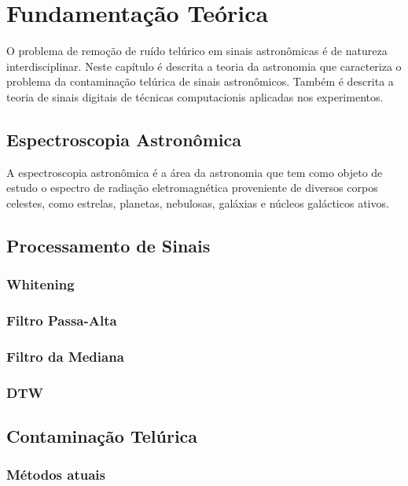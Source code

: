\chapter{Fundamentação Teórica}
\label{cap:fundamentacao-teorica}

O problema de remoção de ruído telúrico em sinais astronômicas é de natureza interdisciplinar.
Neste capítulo é descrita a teoria da astronomia que caracteriza o problema da contaminação telúrica de sinais astronômicos. Também é descrita a teoria de sinais digitais de técnicas computacionis aplicadas nos experimentos.

\section{Espectroscopia Astronômica}

A espectroscopia astronômica é a área da astronomia que tem como objeto de estudo o espectro de radiação eletromagnética proveniente de diversos corpos celestes, como estrelas, planetas, nebulosas, galáxias e núcleos galácticos ativos. 

\section{Processamento de Sinais}
\subsection{Whitening}
\subsection{Filtro Passa-Alta}
\subsection{Filtro da Mediana}
\subsection{DTW}

\section{Contaminação Telúrica}
\subsection{Métodos atuais}


